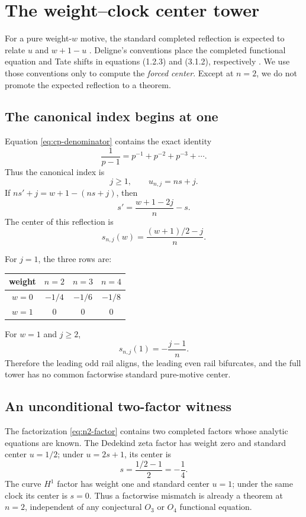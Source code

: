 \section{The weight--clock center tower}\label{sec:center}

For a pure weight-\(w\) motive, the standard completed reflection is
expected to relate \(u\) and \(w+1-u\)
\cite[§1.3]{Serre1970}.  Deligne's conventions place the completed
functional equation and Tate shifts in equations (1.2.3) and (3.1.2),
respectively \cite{Deligne1979}.  We use those conventions only to compute
the \emph{forced center}.  Except at \(n=2\), we do not promote the
expected reflection to a theorem.

\subsection{The canonical index begins at one}

Equation \eqref{eq:cp-denominator} contains the exact identity
\[
 \frac1{p-1}=p^{-1}+p^{-2}+p^{-3}+\cdots.
\]
Thus the canonical index is
\begin{equation}\label{eq:clock}
 j\ge1,\qquad u_{n,j}=ns+j.
\end{equation}
If \(ns'+j=w+1-(ns+j)\), then
\[
 s'=\frac{w+1-2j}{n}-s.
\]
The center of this reflection is
\begin{equation}\label{eq:center-map}
 s_{n,j}(w)=\frac{(w+1)/2-j}{n}.
\end{equation}

For \(j=1\), the three rows are:
\begin{center}
\begin{tabular}{@{}cccc@{}}
\toprule
weight & \(n=2\) & \(n=3\) & \(n=4\)\\
\midrule
\(w=0\)&\(-1/4\)&\(-1/6\)&\(-1/8\)\\
\(w=1\)&\(0\)&\(0\)&\(0\)\\
\bottomrule
\end{tabular}
\end{center}
For \(w=1\) and \(j\ge2\),
\[
 s_{n,j}(1)=-\frac{j-1}{n}.
\]
Therefore the leading odd rail aligns, the leading even rail bifurcates,
and the full tower has no common factorwise standard pure-motive center.

\subsection{An unconditional two-factor witness}

The factorization \eqref{eq:n2-factor} contains two completed factors whose
analytic equations are known.  The Dedekind zeta factor has weight zero and
standard center \(u=1/2\); under \(u=2s+1\), its center is
\[
 s=\frac{1/2-1}{2}=-\frac14.
\]
The curve \(H^1\) factor has weight one and standard center \(u=1\);
under the same clock its center is \(s=0\).  Thus a factorwise mismatch is
already a theorem at \(n=2\), independent of any conjectural \(O_3\) or
\(O_4\) functional equation.

